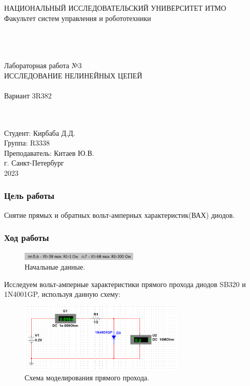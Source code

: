 \documentclass[12pt]{article}
\begin{document}
\begin{titlepage}
\begin{center}
    НАЦИОНАЛЬНЫЙ ИССЛЕДОВАТЕЛЬСКИЙ УНИВЕРСИТЕТ ИТМО \\
    Факультет систем управления и робототехники \\
    \vspace*{10\baselineskip}
    {} \\
    \ \\
    \ \\
    \begin{spacing}{1.5}
    {\large Лабораторная работа №3 \\
    ИССЛЕДОВАНИЕ НЕЛИНЕЙНЫХ ЦЕПЕЙ \\
    \ \\
    Вариант 3R382}
    \end{spacing} \\
    \ \\
    \vspace*{10\baselineskip}
    \hfill {Студент: Кирбаба Д.Д.\ \ \ \ \ \ \ \ \ } \\
    \hfill {Группа: R3338\ \ \ \ \ \ \ \ \ \ \ \ \ \ \ \ \ \ \ \ \ } \\
    \hfill {Преподаватель: Китаев Ю.В.} \\
    \mbox{}
    \vfill {г. Санкт-Петербург\\2023}
\end{center}
\end{titlepage}

\subsubsection*{Цель работы}
Снятие прямых и обратных вольт-амперных характеристик(ВАХ) диодов.

\subsubsection*{Ход работы}
\begin{figure}[H]
    \centering
    \includegraphics[width=0.5\textwidth]{initials.png}
    \caption{Начальные данные.}
    \label{fig:initials}
\end{figure}

Исследуем вольт-амперные характеристики прямого прохода диодов SB320 и 1N4001GP, используя данную схему:
\begin{figure}[H]
    \centering
    \includegraphics[width=0.7\textwidth]{dir_scheme_1_2.png}
    \caption{Схема моделирования прямого прохода.}
    \label{fig:dir_scheme_1_2}
\end{figure}
\end{document}
